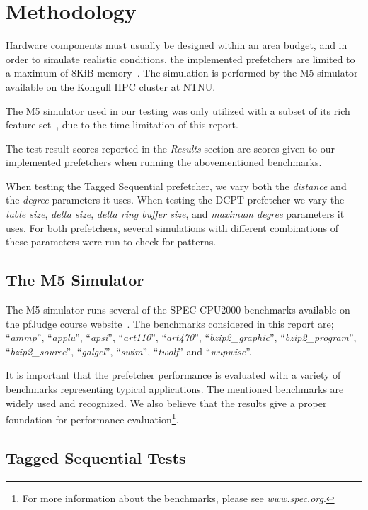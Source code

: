 \section{Methodology}

Hardware components must usually be designed within an area budget, and in order
to simulate realistic conditions, the implemented prefetchers are limited to a
maximum of 8KiB memory~\cite{guidelines}. The simulation is performed by the M5
simulator available on the Kongull HPC cluster at NTNU.

The M5 simulator used in our testing was only utilized with a subset of its rich
feature set~\cite{user_doc}, due to the time limitation of this report.

The test result scores reported in the \textit{Results} section are scores given
to our implemented prefetchers when running the abovementioned benchmarks.

When testing the Tagged Sequential prefetcher, we vary both the \emph{distance}
and the \emph{degree} parameters it uses. When testing the DCPT prefetcher we
vary the \emph{table size}, \emph{delta size}, \emph{delta ring buffer size},
and \emph{maximum degree} parameters it uses. For both prefetchers, several
simulations with different combinations of these parameters were run to check
for patterns.

\subsection{The M5 Simulator}

The M5 simulator runs several of the SPEC CPU2000 benchmarks available on the
pfJudge course website~\cite{guidelines}. The benchmarks considered in this
report are; ``\emph{ammp}'', ``\emph{applu}'', ``\emph{apsi}'',
``\emph{art110}'', ``\emph{art470}'', ``\emph{bzip2\_graphic}'',
``\emph{bzip2\_program}'', ``\emph{bzip2\_source}'', ``\emph{galgel}'',
``\emph{swim}'', ``\emph{twolf}'' and ``\emph{wupwise}''.

It is important that the prefetcher performance is evaluated with a variety of
benchmarks representing typical applications. The mentioned benchmarks are
widely used and recognized. We also believe that the results give a proper
foundation for performance evaluation\footnote{For more information about the
benchmarks, please see \emph{www.spec.org}.}.


\subsection{Tagged Sequential Tests}

